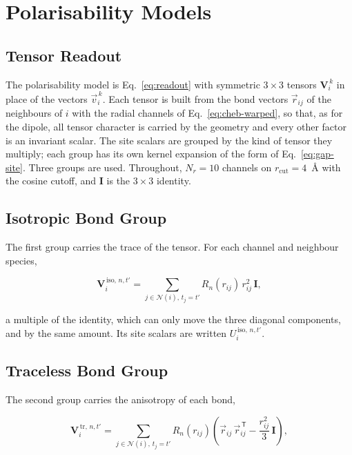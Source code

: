 \documentclass[11pt,a4paper]{article}
\begin{document}
\section{Polarisability Models}\label{sec:pol}

\subsection{Tensor Readout}\label{sec:pol-readout}

The polarisability model is Eq.~\ref{eq:readout} with symmetric $3\times3$ tensors
$\mathbf{V}_i^{\,k}$ in place of the vectors $\vec v_i^{\,k}$. Each tensor is built from the
bond vectors $\vec r_{ij}$ of the neighbours of $i$ with the radial channels of
Eq.~\ref{eq:cheb-warped}, so that, as for the dipole, all tensor character is carried by the
geometry and every other factor is an invariant scalar. The site scalars are grouped by the
kind of tensor they multiply; each group has its own kernel expansion of the form of
Eq.~\ref{eq:gap-site}. Three groups are used. Throughout, $N_r = 10$ channels on
$r_{\mathrm{cut}} = 4$~\AA{} with the cosine cutoff, and $\mathbf{I}$ is the $3\times3$ identity.

\subsection{Isotropic Bond Group}\label{sec:pol-iso}

The first group carries the trace of the tensor. For each channel and neighbour species,

\begin{equation}
\mathbf{V}_i^{\,\mathrm{iso},\,n,t'} = \sum_{j \in \mathcal{N}(i),\, t_j = t'} R_n(r_{ij})\, r_{ij}^2\, \mathbf{I},
\label{eq:pol-iso}
\end{equation}

a multiple of the identity, which can only move the three diagonal components, and by the same
amount. Its site scalars are written $U_i^{\,\mathrm{iso},\,n,t'}$.

\subsection{Traceless Bond Group}\label{sec:pol-tr}

The second group carries the anisotropy of each bond,

\begin{equation}
\mathbf{V}_i^{\,\mathrm{tr},\,n,t'} = \sum_{j \in \mathcal{N}(i),\, t_j = t'} R_n(r_{ij})
\left(\vec r_{ij}\,\vec r_{ij}^{\,\mathsf{T}} - \frac{r_{ij}^2}{3}\,\mathbf{I}\right),
\label{eq:pol-tr}
\end{equation}
\end{document}
